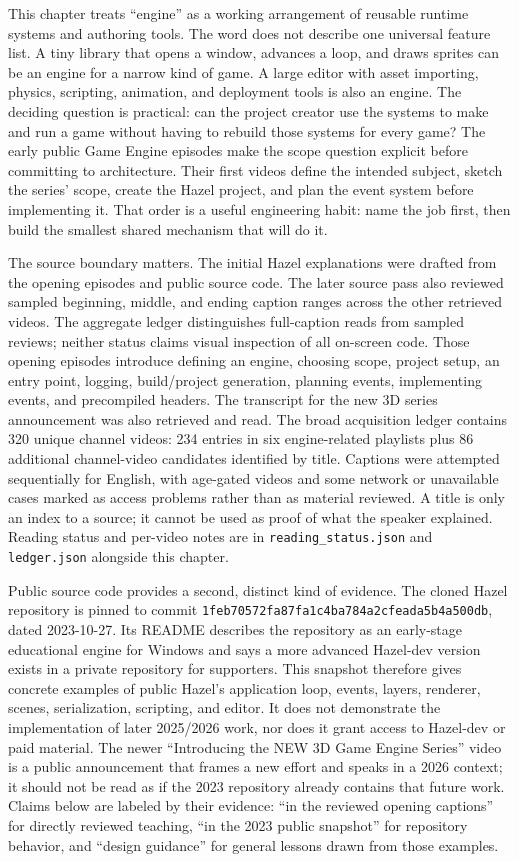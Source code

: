 This chapter treats ``engine'' as a working arrangement of reusable runtime systems and authoring tools. The word does not describe one universal feature list. A tiny library that opens a window, advances a loop, and draws sprites can be an engine for a narrow kind of game. A large editor with asset importing, physics, scripting, animation, and deployment tools is also an engine. The deciding question is practical: can the project creator use the systems to make and run a game without having to rebuild those systems for every game? The early public Game Engine episodes make the scope question explicit before committing to architecture. Their first videos define the intended subject, sketch the series' scope, create the Hazel project, and plan the event system before implementing it. That order is a useful engineering habit: name the job first, then build the smallest shared mechanism that will do it.

The source boundary matters. The initial Hazel explanations were drafted from the opening episodes and public source code. The later source pass also reviewed sampled beginning, middle, and ending caption ranges across the other retrieved videos. The aggregate ledger distinguishes full-caption reads from sampled reviews; neither status claims visual inspection of all on-screen code. Those opening episodes introduce defining an engine, choosing scope, project setup, an entry point, logging, build/project generation, planning events, implementing events, and precompiled headers. The transcript for the new 3D series announcement was also retrieved and read. The broad acquisition ledger contains 320 unique channel videos: 234 entries in six engine-related playlists plus 86 additional channel-video candidates identified by title. Captions were attempted sequentially for English, with age-gated videos and some network or unavailable cases marked as access problems rather than as material reviewed. A title is only an index to a source; it cannot be used as proof of what the speaker explained. Reading status and per-video notes are in \texttt{reading\_status.json} and \texttt{ledger.json} alongside this chapter.

Public source code provides a second, distinct kind of evidence. The cloned Hazel repository is pinned to commit \texttt{1feb70572fa87fa1c4ba784a2cfeada5b4a500db}, dated 2023-10-27. Its README describes the repository as an early-stage educational engine for Windows and says a more advanced Hazel-dev version exists in a private repository for supporters. This snapshot therefore gives concrete examples of public Hazel's application loop, events, layers, renderer, scenes, serialization, scripting, and editor. It does not demonstrate the implementation of later 2025/2026 work, nor does it grant access to Hazel-dev or paid material. The newer ``Introducing the NEW 3D Game Engine Series'' video is a public announcement that frames a new effort and speaks in a 2026 context; it should not be read as if the 2023 repository already contains that future work. Claims below are labeled by their evidence: ``in the reviewed opening captions'' for directly reviewed teaching, ``in the 2023 public snapshot'' for repository behavior, and ``design guidance'' for general lessons drawn from those examples.

